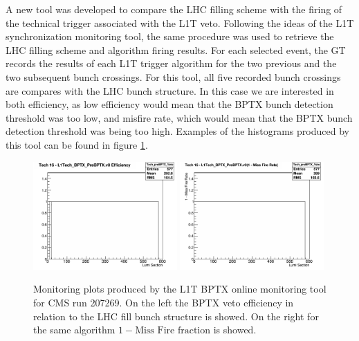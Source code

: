 A new tool was developed to compare the \gls{LHC} filling scheme with the firing of the technical trigger associated with the \gls{L1T} veto. Following the ideas of the \gls{L1T} synchronization monitoring tool, the same procedure was used to retrieve the \gls{LHC} filling scheme and algorithm firing results. For each selected event, the \gls{GT} records the results of each \gls{L1T} trigger algorithm for the two previous and the two subsequent bunch crossings. For this tool, all five recorded bunch crossings are compares with the \gls{LHC} bunch structure. In this case we are interested in both efficiency, as low efficiency would mean that the \gls{BPTX} bunch detection threshold was too low, and misfire rate, which would mean that the \gls{BPTX} bunch detection threshold was being too high. Examples of the histograms produced by this tool can be found in figure \ref{FIGURE:TechnicalWork_BPTXMonitoring}.

\begin{figure}[!htb]
\centering
\includegraphics[width=0.49\textwidth]{Chapter03/L1TOnline/Images/L1TDQM_Online_Run207269_L1TBPTX_Efficiency_Tech_preBPTX_Veto.png}
\includegraphics[width=0.49\textwidth]{Chapter03/L1TOnline/Images/L1TDQM_Online_Run207269_L1TBPTX_MissFire_Tech_preBPTX_Veto.png}
\caption[Monitoring plots produced by the L1T BPTX online monitoring tool for CMS run 207269]
{Monitoring plots produced by the \gls{L1T} \gls{BPTX} online monitoring tool for \gls{CMS} run 207269. On the left the \gls{BPTX} veto efficiency in relation to the \gls{LHC} fill bunch structure is showed. On the right for the same algorithm $1 - \text{Miss Fire fraction}$ is showed.}
\label{FIGURE:TechnicalWork_BPTXMonitoring}
\end{figure}

